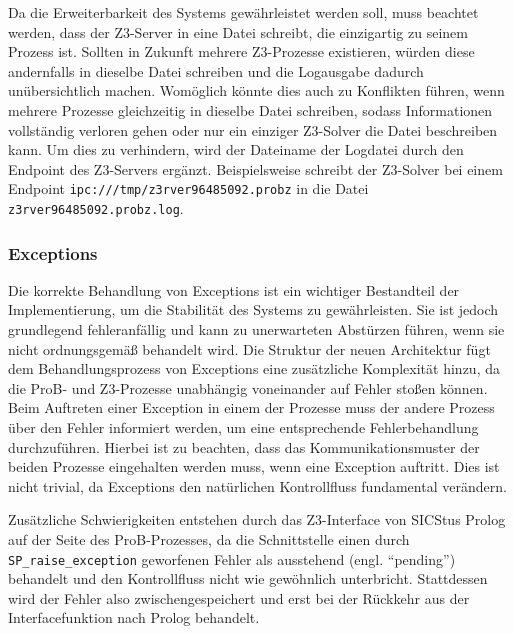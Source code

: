 Da die Erweiterbarkeit des Systems gewährleistet werden soll, muss beachtet werden, dass der Z3-Server in eine Datei schreibt, die einzigartig zu seinem Prozess ist.
Sollten in Zukunft mehrere Z3-Prozesse existieren, würden diese andernfalls in dieselbe Datei schreiben und die Logausgabe dadurch unübersichtlich machen.
Womöglich könnte dies auch zu Konflikten führen, wenn mehrere Prozesse gleichzeitig in dieselbe Datei schreiben, sodass Informationen vollständig verloren gehen oder nur ein einziger Z3-Solver die Datei beschreiben kann.
Um dies zu verhindern, wird der Dateiname der Logdatei durch den Endpoint des Z3-Servers ergänzt.
Beispielsweise schreibt der Z3-Solver bei einem Endpoint \texttt{ipc:///tmp/z3rver96485092.probz} in die Datei \texttt{z3rver96485092.probz.log}.

\subsubsection{Exceptions}
\label{subsec:exceptions}

Die korrekte Behandlung von Exceptions ist ein wichtiger Bestandteil der Implementierung, um die Stabilität des Systems zu gewährleisten.
Sie ist jedoch grundlegend fehleranfällig und kann zu unerwarteten Abstürzen führen, wenn sie nicht ordnungsgemäß behandelt wird.
Die Struktur der neuen Architektur fügt dem Behandlungsprozess von Exceptions eine zusätzliche Komplexität hinzu, da die ProB- und Z3-Prozesse unabhängig voneinander auf Fehler stoßen können.
Beim Auftreten einer Exception in einem der Prozesse muss der andere Prozess über den Fehler informiert werden, um eine entsprechende Fehlerbehandlung durchzuführen.
Hierbei ist zu beachten, dass das Kommunikationsmuster der beiden Prozesse eingehalten werden muss, wenn eine Exception auftritt.
Dies ist nicht trivial, da Exceptions den natürlichen Kontrollfluss fundamental verändern.

Zusätzliche Schwierigkeiten entstehen durch das Z3-Interface von SICStus Prolog auf der Seite des ProB-Prozesses,
da die Schnittstelle einen durch \texttt{SP\_raise\_exception} geworfenen Fehler als ausstehend (engl. \enquote{pending}) behandelt und den Kontrollfluss nicht wie gewöhnlich unterbricht.
Stattdessen wird der Fehler also zwischengespeichert und erst bei der Rückkehr aus der Interfacefunktion nach Prolog behandelt.

